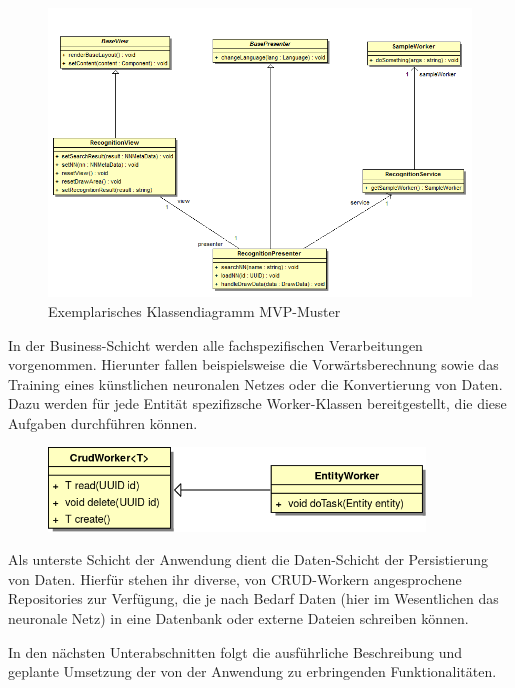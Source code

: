 \begin{figure}[H]
	\centering
	\includegraphics[width=1\textwidth]{Abbildungen/UML/daniel/Klassendiagramm-MVP.png}
	\caption{Exemplarisches Klassendiagramm MVP-Muster}
	\label{mvp-exemplarisch}
\end{figure}


In der Business-Schicht werden alle fachspezifischen Verarbeitungen vorgenommen. Hierunter fallen beispielsweise die Vorwärtsberechnung sowie das Training eines künstlichen neuronalen Netzes oder die Konvertierung von Daten. Dazu werden für jede Entität spezifizsche Worker-Klassen bereitgestellt, die diese Aufgaben durchführen können.

\begin{figure}[H]
\begin{center}
\includegraphics[width=10cm]{Abbildungen/UML/jan/workerClassDiagramm.png}
\end{center}
\end{figure}

Als unterste Schicht der Anwendung dient die Daten-Schicht der Persistierung von Daten. Hierfür stehen ihr diverse, von CRUD-Workern angesprochene Repositories zur Verfügung, die je nach Bedarf Daten (hier im Wesentlichen das neuronale Netz) in eine Datenbank oder externe Dateien schreiben können.

In den nächsten Unterabschnitten folgt die ausführliche Beschreibung und geplante Umsetzung der von der Anwendung zu erbringenden Funktionalitäten.  

